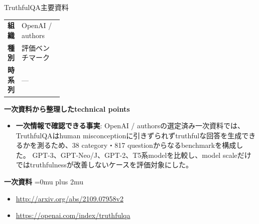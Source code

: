\begin{technicalnote}{TruthfulQA}{主要資料}
\begingroup
\begin{tabularx}{\linewidth}{@{}>{\bfseries}p{0.22\linewidth}X@{}}
組織 & OpenAI / authors \\
種別 & 評価ベンチマーク \\
時系列 & — \\
\end{tabularx}
\smallskip
{\bfseries 一次資料から整理したtechnical points}
\begin{itemize}[leftmargin=1.5em,itemsep=0.35em]
\item \textbf{一次情報で確認できる事実}: OpenAI / authorsの選定済み一次資料では、TruthfulQAはhuman misconceptionに引きずられずtruthfulな回答を生成できるかを測るため、38 category・817 questionからなるbenchmarkを構成した。 GPT-3、GPT-Neo/J、GPT-2、T5系modelを比較し、model scaleだけではtruthfulnessが改善しないケースを評価対象にした。
\end{itemize}
\begin{minipage}{\linewidth}
\begin{samepage}
{\bfseries 一次資料}
\begingroup\sloppy
\Urlmuskip=0mu plus 2mu\relax
\begin{itemize}[leftmargin=1.5em,itemsep=0.25em]
\item {\scriptsize\url{http://arxiv.org/abs/2109.07958v2}}
\item {\scriptsize\url{https://openai.com/index/truthfulqa}}
\end{itemize}
\endgroup
\end{samepage}
\end{minipage}
\endgroup
\end{technicalnote}
\medskip

